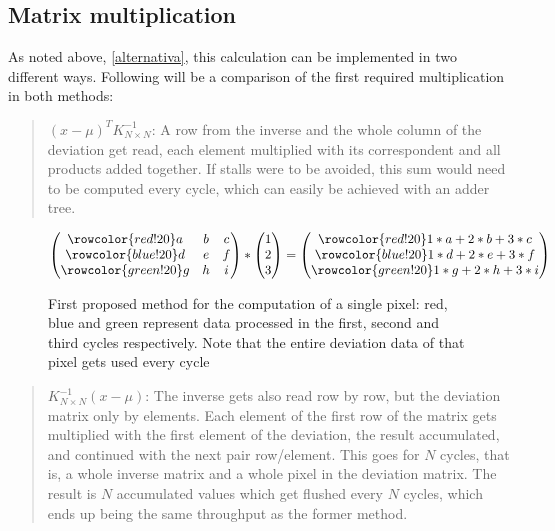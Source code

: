 \subsection{Matrix multiplication}


\newcommand\rb{\colorbox{red!20}}
\newcommand\bb{\colorbox{blue!20}}
\newcommand\gb{\colorbox{green!20}}
\newcommand\rr{\rowcolor{red!20}}
\newcommand\br{\rowcolor{blue!20}}
\newcommand\gr{\rowcolor{green!20}}
As noted above,  \ref{alternativa}, this calculation can be implemented in two different ways.
\noindent Following will be a comparison of the first required multiplication in both methods:
\begin{quote}
	\((x-\mu)^{T} K^{-1}_{N \times N}\):	
	A row from the inverse and the whole column of the deviation get read, each element multiplied with its correspondent and all products added together. If stalls were to be avoided, this sum would need to be computed every cycle, which can easily be achieved with an adder tree.
\end{quote}

\begin{figure}[h]%
\[
\begin{pmatrix}
\rr a & b & c \\ 
\br d & e & f \\ 
\gr g & h & i
\end{pmatrix}
*
\begin{pmatrix}
1\\
2\\
3
\end{pmatrix}
=
\begin{pmatrix}
\rr 1*a+2*b+3*c\\
\br 1*d+2*e+3*f\\
\gr 1*g+2*h+3*i
\end{pmatrix} 
\]
\caption[Optional: Short caption to appear in List of Figures]{First proposed method for the computation of a single pixel: red, blue and green represent data processed in the first, second and third cycles respectively. Note that the entire deviation data of that pixel gets used every cycle}
\end{figure}
\pagebreak
		
\begin{quote}
	\(K^{-1}_{N \times N} (x-\mu)\):
	The inverse gets also read row by row, but the deviation matrix only by elements. Each element of the first row of the matrix gets multiplied with the first element of the deviation, the result accumulated, and continued with the next pair row/element. This goes for \(N\) cycles, that is, a whole inverse matrix and a whole pixel in the deviation matrix. The result is \(N\) accumulated values which get flushed every \(N\) cycles, which ends up being the same throughput as the former method.
\end{quote}

